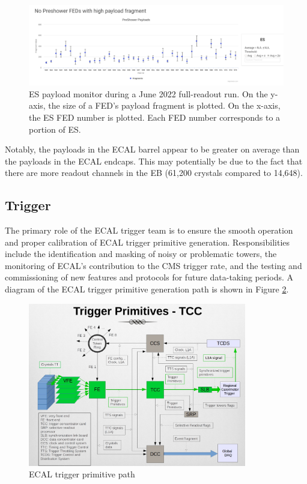 \begin{figure}[H]
    \centering
    \includegraphics[width=\textwidth]{Images/ECAL_Operations/PayloadMonitor_ES.png}
    \caption{ES payload monitor during a June 2022 full-readout run. On the y-axis, the size of a FED's payload fragment is plotted. On the x-axis, the ES FED number is plotted. Each FED number corresponds to a portion of ES.}
    \label{fig:PayloadMonitor_ES}
\end{figure}

Notably, the payloads in the ECAL barrel appear to be greater on average than the payloads in the ECAL endcaps. This may potentially be due to the fact that there are more readout channels in the EB (61,200 crystals compared to 14,648). 

\subsection{Trigger}

The primary role of the ECAL trigger team is to ensure the smooth operation and proper calibration of ECAL trigger primitive generation. Responsibilities include the identification and masking of noisy or problematic towers, the monitoring of ECAL's contribution to the CMS trigger rate, and the testing and commissioning of new features and protocols for future data-taking periods. A diagram of the ECAL trigger primitive generation path is shown in Figure \ref{fig:ECAL_TCC_Diagram}.

\begin{figure}[H]
    \centering
    \includegraphics[width=0.85\textwidth]{Images/ECAL_Operations/ECAL_TCC_Diagram.png}
    \caption{ECAL trigger primitive path}
    \label{fig:ECAL_TCC_Diagram}
\end{figure}


